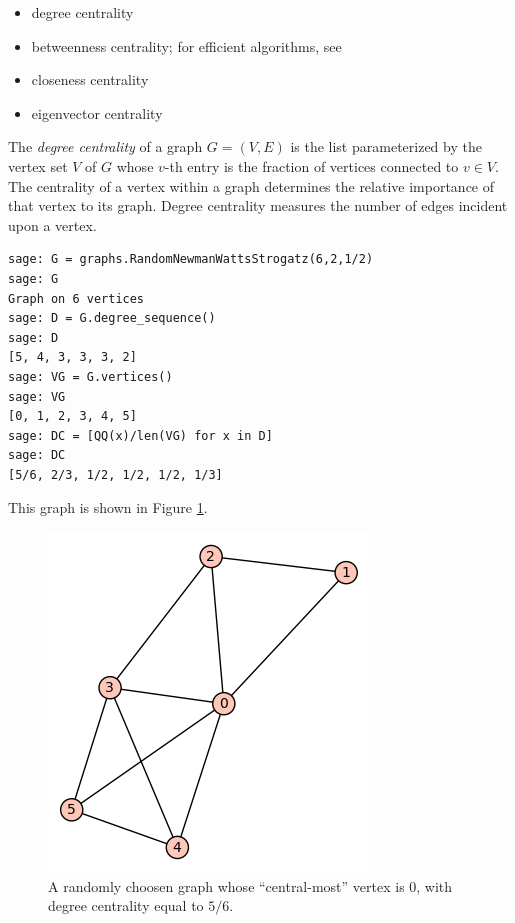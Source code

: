 \begin{itemize}
\item degree centrality

\item betweenness centrality; for efficient algorithms,
  see~\cite{Brandes2001, YangChen2011}

\item closeness centrality

\item eigenvector centrality
\end{itemize}


The {\it degree centrality} of a graph $G = (V,E)$ is the list parameterized by the 
vertex set $V$ of $G$ whose $v$-th entry is the fraction of 
vertices connected to $v\in V$.
The centrality of a vertex within a graph determines the
relative importance of that vertex to its graph. Degree centrality
measures the number of edges incident upon a vertex.

\begin{lstlisting}
sage: G = graphs.RandomNewmanWattsStrogatz(6,2,1/2)
sage: G
Graph on 6 vertices                                  
sage: D = G.degree_sequence()   
sage: D
[5, 4, 3, 3, 3, 2]
sage: VG = G.vertices()   
sage: VG
[0, 1, 2, 3, 4, 5]    
sage: DC = [QQ(x)/len(VG) for x in D]
sage: DC
[5/6, 2/3, 1/2, 1/2, 1/2, 1/3]
\end{lstlisting}

This graph is shown in Figure \ref{fig:distance_connectivity:random-NWS-graph}.

\begin{figure}[!htbp]
\centering
{}
\includegraphics{image/distance-connectivity/random-NWS-graph}
\caption{A randomly choosen graph whose ``central-most'' vertex is $0$, with 
degree centrality equal to $5/6$.}
\label{fig:distance_connectivity:random-NWS-graph}
\end{figure}

